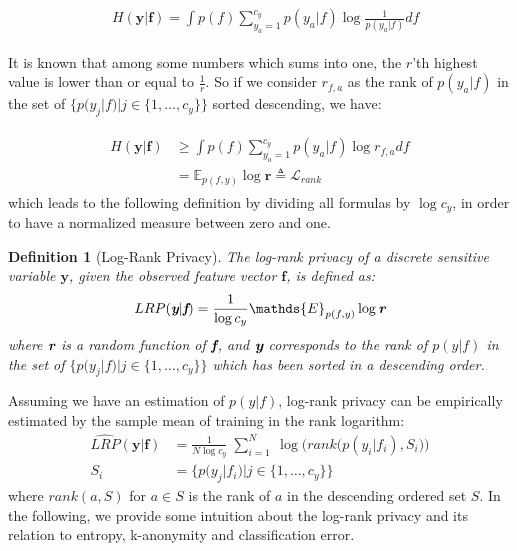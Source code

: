 \documentclass[10pt,journal,compsoc]{IEEEtran}
\newtheorem{definition}[theorem]{Definition}
\begin{document}
\begin{align*}
\begin{split}
& H(\textbf{y}|\textbf{f}) = \int p(f) \sum_{y_a=1}^{c_y} p(y_a|f) \log \frac{1}{p(y_a|f)} df %
\end{split}
\end{align*}%

It is known that among some numbers which sums into one, the $r$'th highest value is lower than or equal to $\frac{1}{r}$. So if we consider $r_{f,a}$ as the rank of $p(y_a|f)$ in the set of $\big\{p(y_j|f) | j \in \{1,\ldots,c_y\}\big\}$ sorted descending, we have:

\begin{align}
\begin{split}
 H(\textbf{y}|\textbf{f}) & \geq \int p(f) \sum_{y_a=1}^{c_y} p(y_a|f) \log r_{f,a} df \\
& = \mathds{E}_{p(f,y)} \log \textbf{r} \triangleq \mathcal{L}_{rank}
\end{split}
\end{align}
which leads to the following definition by dividing all formulas by $\log c_y$, in order to have a normalized measure between zero and one.

\begin{definition}[Log-Rank Privacy]
The \emph{log-rank privacy} of a discrete sensitive variable $\textbf{y}$, given the observed feature vector $\textbf{f}$, is defined as:
\begin{align}
LRP(\emph{\textbf{y}}|\emph{\textbf{f}}) = \frac{1}{\log c_y} \mathds{E}_{p(f,y)} \log \emph{\textbf{r}}
\end{align}
where $\emph{\textbf{r}}$ is a random function of $\emph{\textbf{f}}$, and $\emph{\textbf{y}}$ corresponds to the rank of $p(y|f)$ in the set of $\big\{p(y_j|f) | j \in \{1,\ldots,c_y\}\big\}$ which has been sorted in a descending order.
\end{definition}Assuming we have an estimation of $p(y|f)$, log-rank privacy can be empirically estimated by the sample mean of training in the rank logarithm:
\begin{align*}
\hat{LRP}(\textbf{y}|\textbf{f}) &= \frac{1}{N \log c_y}\; \sum_{i=1}^N \ \log\Big(rank\big(p(y_i|f_i), S_i\big)\Big) \\
S_i &= \big\{p(y_j|f_i) | j \in \{1,\ldots,c_y\}\big\}
\end{align*}
where $rank(a,S)$ for $a \in S$ is the rank of $a$ in the descending ordered set $S$. In the following, we provide some intuition about the log-rank privacy and its relation to entropy, k-anonymity and classification error.\\
\end{document}
